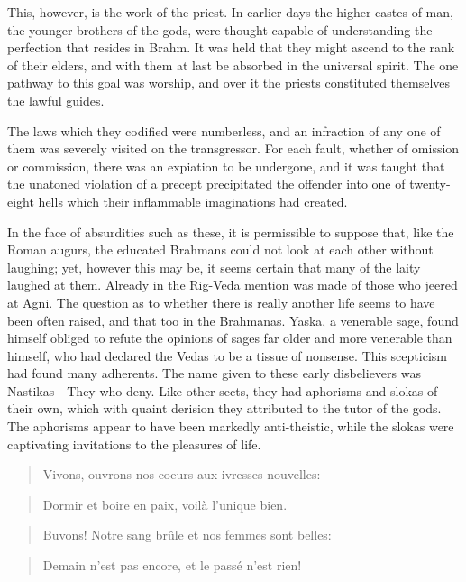 \documentclass[]{book}
\begin{document}
This, however, is the work of the priest. In earlier days the higher
castes of man, the younger brothers of the gods, were thought capable of
understanding the perfection that resides in Brahm. It was held that
they might ascend to the rank of their elders, and with them at last be
absorbed in the universal spirit. The one pathway to this goal was
worship, and over it the priests constituted themselves the lawful
guides.

The laws which they codified were numberless, and an infraction of any
one of them was severely visited on the transgressor. For each fault,
whether of omission or commission, there was an expiation to be
undergone, and it was taught that the unatoned violation of a precept
precipitated the offender into one of twenty-eight hells which their
inflammable imaginations had created.

In the face of absurdities such as these, it is permissible to suppose
that, like the Roman augurs, the educated Brahmans could not look at
each other without laughing; yet, however this may be, it seems certain
that many of the laity laughed at them. Already in the Rig-Veda mention
was made of those who jeered at Agni. The question as to whether there
is really another life seems to have been often raised, and that too in
the Brahmanas. Yaska, a venerable sage, found himself obliged to refute
the opinions of sages far older and more venerable than himself, who had
declared the Vedas to be a tissue of nonsense. This scepticism had found
many adherents. The name given to these early disbelievers was Nastikas
- They who deny. Like other sects, they had aphorisms and slokas of
their own, which with quaint derision they attributed to the tutor of
the gods. The aphorisms appear to have been markedly anti-theistic,
while the slokas were captivating invitations to the pleasures of life.

\begin{quote}
Vivons, ouvrons nos coeurs aux ivresses nouvelles:
\end{quote}

\begin{quote}
Dormir et boire en paix, voilà l'unique bien.
\end{quote}

\begin{quote}
Buvons! Notre sang brûle et nos femmes sont belles:
\end{quote}

\begin{quote}
Demain n'est pas encore, et le passé n'est rien!
\end{quote}
\end{document}
